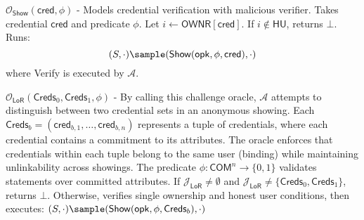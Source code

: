 \noindent  $\mathcal{O}_{\mathsf{Show}}(\mathsf{cred}, \phi)$ - Models credential verification with malicious verifier. Takes credential $\mathsf{cred}$ and predicate $\phi$. Let $i \gets \mathsf{OWNR}[\mathsf{cred}]$. If $i \notin \mathsf{HU}$, returns $\bot$. Runs:
\[
(S, \cdot) \sample (\mathsf{Show}(\mathsf{opk}, \phi, \mathsf{cred}), \cdot)
\]
where Verify is executed by $\mathcal{A}$.

\noindent $\mathcal{O}_{\mathsf{LoR}}(\mathsf{Creds}_0, \mathsf{Creds}_1, \phi)$ - By calling this challenge oracle, $\mathcal{A}$ attempts to distinguish between two credential sets in an anonymous showing. Each $\mathsf{Creds}_b = (\mathsf{cred}_{b,1},\ldots,\mathsf{cred}_{b,n})$ represents a tuple of credentials, where each credential contains a commitment to its attributes. The oracle enforces that credentials within each tuple belong to the same user (binding) while maintaining unlinkability across showings. The predicate $\phi: \mathsf{COM}^n \rightarrow \{0,1\}$ validates statements over committed attributes. If $\mathcal{J}_{\mathsf{LoR}} \neq \emptyset$ and $\mathcal{J}_{\mathsf{LoR}} \neq \{\mathsf{Creds}_0, \mathsf{Creds}_1\}$, returns $\bot$. Otherwise, verifies single ownership and honest user conditions, then executes:
$(S, \cdot) \sample (\mathsf{Show}(\mathsf{opk}, \phi, \mathsf{Creds}_b), \cdot)$

